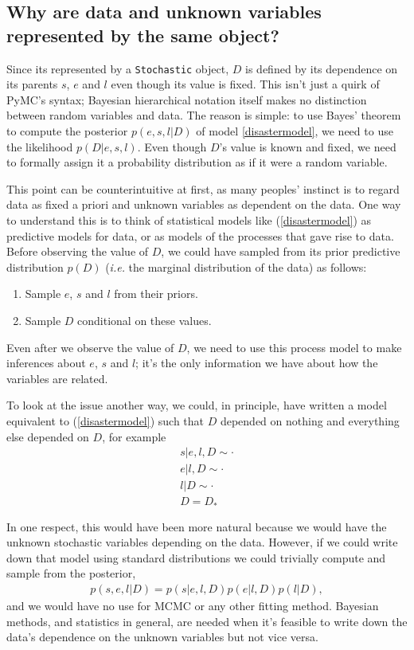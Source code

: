 \subsection*{Why are data and unknown variables represented by the same object?}
Since its represented by a \texttt{Stochastic} object, $D$ is defined by its dependence on its parents $s$, $e$ and $l$ even though its value is fixed. This isn't just a quirk of PyMC's syntax; Bayesian hierarchical notation itself makes no distinction between random variables and data. The reason is simple: to use Bayes' theorem to compute the posterior $p(e,s,l|D)$ of model \ref{disastermodel}, we need to use the likelihood $p(D|e,s,l)$. Even though $D$'s value is known and fixed, we need to formally assign it a probability distribution as if it were a random variable.

This point can be counterintuitive at first, as many peoples' instinct is to regard data as fixed a priori and unknown variables as dependent on the data. One way to understand this is to think of statistical models like (\ref{disastermodel}) as predictive models for data, or as models of the processes that gave rise to data. Before observing the value of $D$, we could have sampled from its prior predictive distribution $p(D)$ (\emph{i.e.} the marginal distribution of the data) as follows:
\begin{enumerate}
    \item Sample $e$, $s$ and $l$ from their priors.
    \item Sample $D$ conditional on these values.
\end{enumerate}
Even after we observe the value of $D$, we need to use this process model to make inferences about $e$, $s$ and $l$; it's the only information we have about how the variables are related.

\medskip
To look at the issue another way, we could, in principle, have written a model equivalent to (\ref{disastermodel}) such that $D$ depended on nothing and everything else depended on $D$, for example
\begin{eqnarray*}
    s|e,l,D\sim\cdot\\
    e|l,D\sim\cdot\\
    l|D\sim\cdot\\
    D=D_*
\end{eqnarray*}

In one respect, this would have been more natural because we would have the unknown stochastic variables depending on the data. However, if we could write down that model using standard distributions we could trivially compute and sample from the posterior,
\begin{eqnarray*}
    p(s,e,l|D) = p(s|e, l, D) p(e|l, D) p(l|D),
\end{eqnarray*}
and we would have no use for MCMC or any other fitting method. Bayesian methods, and statistics in general, are needed when it's feasible to write down the data's dependence on the unknown variables but not vice versa.


